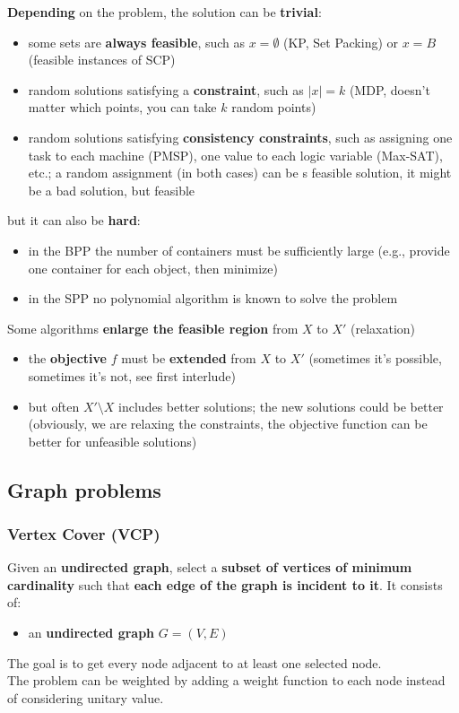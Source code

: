 \documentclass[11pt]{article}
\begin{document}
	\textbf{Depending} on the problem, the solution can be \textbf{trivial}: 
	\begin{itemize}
		\item some sets are \textbf{always feasible}, such as $x = \emptyset$ (KP, Set Packing) or $x = B$ (feasible instances of SCP)
		\item random solutions satisfying a \textbf{constraint}, such as $|x| = k$ (MDP, doesn't matter which points, you can take $k$ random points)
		\item random solutions satisfying \textbf{consistency constraints}, such as assigning one task to each machine (PMSP), one value to each logic variable (Max-SAT), etc.; a random assignment (in both cases) can be s feasible solution, it might be a bad solution, but feasible
	\end{itemize}
	but it can also be \textbf{hard}:
	\begin{itemize}
		\item in the BPP the number of containers must be sufficiently large (e.g., provide one container for each object, then minimize)
		\item in the SPP no polynomial algorithm is known to solve the problem
	\end{itemize}
	Some algorithms \textbf{enlarge the feasible region} from $X$ to $X'$ (relaxation)
	\begin{itemize}
		\item the \textbf{objective} $f$ must be \textbf{extended} from $X$ to $X'$ (sometimes it's possible, sometimes it's not, see first interlude)
		\item but often $X' \setminus X$ includes better solutions; the new solutions could be better (obviously, we are relaxing the constraints, the objective function can be better for unfeasible solutions)
	\end{itemize}
	
	\newpage
	
	\subsection{Graph problems}
	\subsubsection{Vertex Cover (VCP)}
	Given an \textbf{undirected graph}, select a \textbf{subset of vertices of minimum cardinality} such that \textbf{each edge of the graph is incident to it}. It consists of:
	\begin{itemize}
		\item an \textbf{undirected graph} $G = (V,E)$
	\end{itemize}
	The goal is to get every node adjacent to at least one selected node.\\
	The problem can be weighted by adding a weight function to each node instead of considering unitary value.\\
	
\end{document}
